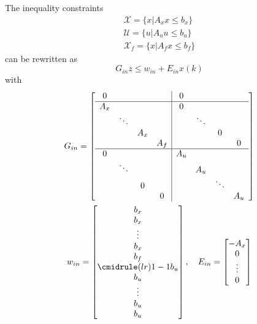 The inequality constraints
\begin{gather*}
    \mathcal{X} = \{x|A_x x \leq b_x\} \\
    \mathcal{U} = \{u|A_u u \leq b_u\} \\
    \mathcal{X}_f = \{x|A_f x \leq b_f\}
\end{gather*}
can be rewritten as
\begin{equation*}
    G_{in} z \leq w_{in} + E_{in} x(k)
\end{equation*}
with
\begin{gather*}
    G_{in} = \left[
        \begin{array}{cccc|cccc} %
            0   &        &     &     & 0   &        &        &     \\
            \hline %
            A_x &        &     &     & 0   &        &        &     \\
                & \ddots &     &     &     & \ddots &        &     \\
                &        & A_x &     &     &        & 0      &     \\
                &        &     & A_f &     &        &        & 0   \\
            \hline %
            0   &        &     &     & A_u &        &        &     \\
                & \ddots &     &     &     & A_u    &        &     \\
                &        & 0   &     &     &        & \ddots &     \\
                &        &     & 0   &     &        &        & A_u
        \end{array}
        \right]\\
    w_{in} = \begin{bmatrix}
        b_x                    \\
        b_x                    \\
        \vdots                 \\
        b_x                    \\
        b_f                    \\
        \cmidrule(lr){1-1} b_u \\
        b_u                    \\
        \vdots                 \\
        b_u                    \\
        b_u
    \end{bmatrix}, \quad
    E_{in} =\begin{bmatrix}
        -A_x   \\
        0      \\
        \vdots \\
        0
    \end{bmatrix}
\end{gather*}

